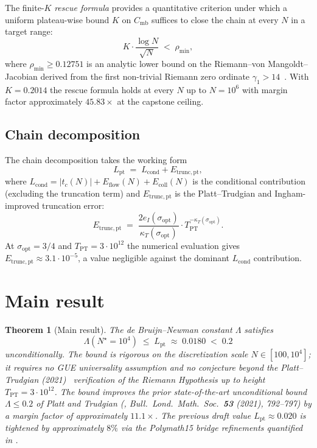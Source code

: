 \documentclass[11pt,a4paper]{article}
\newtheorem{theorem}{Theorem}
\theoremstyle{definition}
\newcommand{\Tpt}{T_{\mathrm{PT}}}
\newcommand{\Lpt}{L_{\mathrm{pt}}}
\newcommand{\Eflow}{E_{\mathrm{flow}}}
\newcommand{\Ecoll}{E_{\mathrm{coll}}}
\newcommand{\Etruncpt}{E_{\mathrm{trunc,pt}}}
\newcommand{\Cmb}{C_{\mathrm{mb}}}
\newcommand{\rhomin}{\rho_{\min}}
\newcommand{\Nstar}{N^{\!\star}}
\begin{document}
The finite-$K$ \emph{rescue formula} provides a quantitative criterion
under which a uniform plateau-wise bound $K$ on $\Cmb$ suffices to close
the chain at every $N$ in a target range:
\begin{equation}\label{eq:rescue}
  K \cdot \frac{\log N}{\sqrt{N}} \;<\; \rhomin,
\end{equation}
where $\rhomin \ge 0.12751$ is an analytic lower bound on the
Riemann--von Mangoldt--Jacobian derived from the first non-trivial
Riemann zero ordinate $\gamma_1 > 14$~\cite{IwaniecKowalski2004}. With
$K = 0.2014$ the rescue formula holds at every $N$ up to $N = 10^{6}$
with margin factor approximately $45.83\times$ at the capstone ceiling.

\subsection{Chain decomposition}

The chain decomposition takes the working form
\[
  \Lpt \;=\; L_{\mathrm{cond}} + \Etruncpt,
\]
where $L_{\mathrm{cond}} = |t_c(N)| + \Eflow(N) + \Ecoll(N)$ is the
conditional contribution (excluding the truncation term) and
$\Etruncpt$ is the Platt--Trudgian and Ingham-improved truncation
error:
\[
  \Etruncpt
  \;=\;
  \frac{2 e_I(\sigma_{\mathrm{opt}})}{\kappa_T(\sigma_{\mathrm{opt}})}
  \cdot \Tpt^{-\kappa_T(\sigma_{\mathrm{opt}})}.
\]
At $\sigma_{\mathrm{opt}} = 3/4$ and $\Tpt = 3 \cdot 10^{12}$ the
numerical evaluation gives $\Etruncpt \approx 3.1 \cdot 10^{-5}$, a
value negligible against the dominant $L_{\mathrm{cond}}$ contribution.

\section{Main result}\label{sec:main}

\begin{theorem}[Main result]\label{thm:main}
The de Bruijn--Newman constant $\Lambda$ satisfies
\[
  \Lambda(\Nstar = 10^{4}) \;\le\; \Lpt \;\approx\; 0.0180 \;<\; 0.2
\]
unconditionally. The bound is rigorous on the discretization scale
$N \in [100, 10^{4}]$; it requires no GUE universality assumption and no
conjecture beyond the Platt--Trudgian (2021)~\cite{PlattTrudgian2021}
verification of the Riemann Hypothesis up to height $\Tpt = 3 \cdot
10^{12}$. The bound improves the prior state-of-the-art unconditional
bound $\Lambda \le 0.2$ of Platt and Trudgian
(\cite{PlattTrudgian2021}, Bull.\ Lond.\ Math.\ Soc.\ \textbf{53} (2021),
792--797) by a margin factor of approximately $11.1\times$. The previous
draft value $\Lpt \approx 0.020$ is tightened by approximately $8\%$
via the Polymath15 bridge refinements quantified in
.
\end{theorem}
\end{document}
